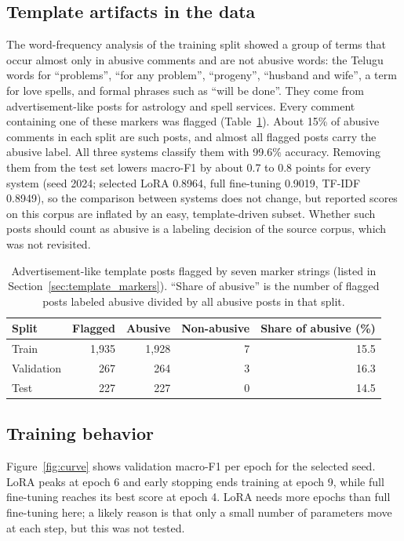 \documentclass{svproc}
\begin{document}
\subsection{Template artifacts in the data}
The word-frequency analysis of the training split showed a group of terms that occur almost only in abusive comments and are not abusive words: the Telugu words for ``problems'', ``for any problem'', ``progeny'', ``husband and wife'', a term for love spells, and formal phrases such as ``will be done''. They come from advertisement-like posts for astrology and spell services. Every comment containing one of these markers was flagged (Table~\ref{tab:template}). About 15\% of abusive comments in each split are such posts, and almost all flagged posts carry the abusive label. All three systems classify them with 99.6\% accuracy. Removing them from the test set lowers macro-F1 by about 0.7 to 0.8 points for every system (seed 2024; selected LoRA 0.8964, full fine-tuning 0.9019, TF-IDF 0.8949), so the comparison between systems does not change, but reported scores on this corpus are inflated by an easy, template-driven subset. Whether such posts should count as abusive is a labeling decision of the source corpus, which was not revisited.

\begin{table}[t]
\caption{Advertisement-like template posts flagged by seven marker strings (listed in Section~\ref{sec:template_markers}). ``Share of abusive'' is the number of flagged posts labeled abusive divided by all abusive posts in that split.}
\label{tab:template}
\centering
\footnotesize
\setlength{\tabcolsep}{4pt}
\begin{tabular}{lrrrr}
\toprule
Split & Flagged & Abusive & Non-abusive & Share of abusive (\%) \\
\midrule
Train      & 1,935 & 1,928 & 7 & 15.5 \\
Validation & 267   & 264   & 3 & 16.3 \\
Test       & 227   & 227   & 0 & 14.5 \\
\bottomrule
\end{tabular}
\end{table}

\subsection{Training behavior}
Figure~\ref{fig:curve} shows validation macro-F1 per epoch for the selected seed. LoRA peaks at epoch 6 and early stopping ends training at epoch 9, while full fine-tuning reaches its best score at epoch 4. LoRA needs more epochs than full fine-tuning here; a likely reason is that only a small number of parameters move at each step, but this was not tested.
\end{document}
